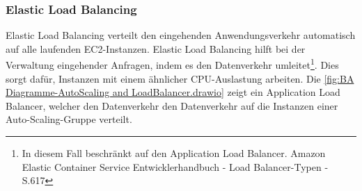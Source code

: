 \subsubsection*{Elastic Load Balancing}%
Elastic Load Balancing verteilt den eingehenden Anwendungsverkehr automatisch auf alle laufenden EC2-Instanzen. Elastic Load Balancing hilft bei der Verwaltung eingehender Anfragen, indem es den Datenverkehr umleitet\footnote{In diesem Fall beschränkt auf den Application Load Balancer. Amazon Elastic Container Service Entwicklerhandbuch - Load Balancer-Typen - S.617\cite{AMZ39}}. Dies sorgt dafür, Instanzen mit einem ähnlicher CPU-Auslastung arbeiten. Die \autoref{fig:BA Diagramme-AutoScaling and LoadBalancer.drawio} zeigt ein Application Load Balancer, welcher den Datenverkehr den Datenverkehr auf die Instanzen einer Auto-Scaling-Gruppe verteilt.


